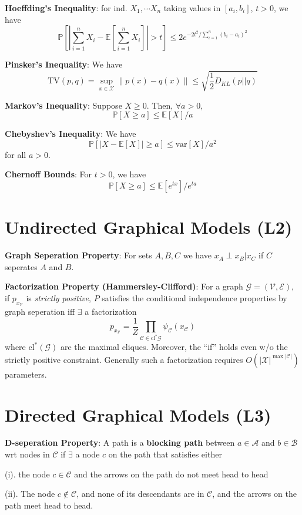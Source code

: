 \documentclass[9pt]{article}
\begin{document}
\begin{multicols}{2}
\textbf{Hoeffding's Inequality}: for ind. $X_1,\cdots X_n$ taking
values in $[a_i,b_i]$, $t > 0$, we have 
$$\mathbb{P}\left[\left|\sum_{i=1}^{n}X_i - \mathbb{E}\left[\sum_{i=1}^{n}
X_i\right]\right| > t \right] \le 2e^{-2t^2/{\sum_{i=1}^{n}(b_i-a_i)^2}}$$

\textbf{Pinsker's Inequality}: We have $$\text{TV}(p,q)=\sup_{x \in \mathcal{X}} \left\|p(x)-q(x)\right\| \le \sqrt{\frac{1}{2}D_{KL}(p||q)}$$

\textbf{Markov's Inequality}: Suppose $X \ge 0$. Then, $\forall a > 0$, $$\mathbb{P}[X \ge a] \le \mathbb{E}[X]/a$$

\textbf{Chebyshev's Inequality}: We have $$\mathbb{P}[|X-\mathbb{E}[X]| \ge a] \le \text{var}[X]/a^2$$ for all $a > 0$.

\textbf{Chernoff Bounds}: For $t > 0$, we have $$\mathbb{P}[X \ge a
] \le \mathbb{E}[e^{tx}]/e^{ta}$$
\section{Undirected Graphical Models (L2)}
\textbf{Graph Seperation Property}: For sets $A,B,C$ we have 
$x_{A} \perp x_{B} | x_{C}$ if $C$ seperates $A$ and $B$.

\textbf{Factorization Property (Hammersley-Clifford)}: For a graph
$\mathcal{G}=(\mathcal{V},\mathcal{E})$, if $p_{x_{\mathcal{V}}}$ is
\textit{strictly positive}, $P$ satisfies the conditional 
independence properties by graph seperation iff $\exists$ a
factorization $$p_{x_{\mathcal{V}}}=\frac{1}{Z}\prod_{\mathcal{C} 
\in \text{cl}^*{\mathcal{G}}} \psi_{\mathcal{C}}(x_{\mathcal{C}})$$ where $\text{cl}^*(\mathcal{G})$ are the maximal cliques. Moreover,
the ``if'' holds even w/o the strictly positive constraint. Generally such a factorization requires $O(|\mathcal{X}|^{\max|\mathcal{C}|})$ parameters. 

\section{Directed Graphical Models (L3)}
\textbf{D-seperation Property}: A path is a \textbf{blocking path} between 
$a \in \mathcal{A}$ and $b \in \mathcal{B}$ wrt nodes in $\mathcal{C}$ if $\exists$ a node $c$ on the path that satisfies either 

(i). the node $c \in \mathcal{C}$ and the arrows on the path do not meet head to head

(ii). The node $c \not\in \mathcal{C}$, and none of its descendants
are in $\mathcal{C}$, and the arrows on the path meet head to head.


\end{multicols}
\end{document}
